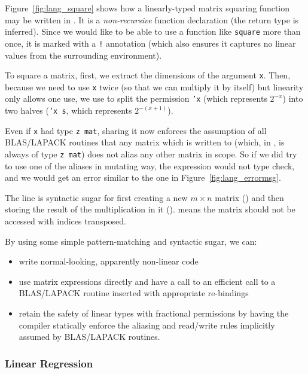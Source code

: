 Figure~\ref{fig:lang_square} shows how a linearly-typed matrix squaring
function may be written in \lang. It is a \emph{non-recursive} function
declaration (the return type is inferred). Since we would like to be able to
use a function like \texttt{square} more than once, it is marked with a
\texttt{!} annotation (which also ensures it captures no linear values from the
surrounding environment).

To square a matrix, first, we extract the dimensions of the argument
\texttt{x}. Then, because we need to use \texttt{x} twice (so that we can
multiply it by itself) but linearity only allows one use, we use  to split the permission \texttt{'x} (which
represents $2^{-x}$) into two halves (\texttt{'x s}, which represents $2^{-(x+1)}$).

Even if \texttt{x} had type \texttt{z mat}, sharing it now enforces the
assumption of all BLAS/LAPACK routines that any matrix which is written to
(which, in \lang, is always of type \texttt{z mat}) does not alias any other
matrix in scope. So if we did try to use one of the aliases in mutating way,
the expression would not type check, and we would get an error similar to the
one in Figure~\ref{fig:lang_errormsg}.

The line  is syntactic sugar for
first creating a new $m \times n$ matrix () and
then storing the result of the multiplication in it ().  means
the matrix should not be accessed with indices transposed.

By using some simple pattern-matching and syntactic sugar, we can:
\begin{itemize}
    \item write normal-looking, apparently non-linear code
    \item use matrix expressions directly and have a call to an efficient
        call to a BLAS/LAPACK routine inserted with appropriate re-bindings
    \item retain the safety of linear types with fractional permissions by
        having the compiler statically enforce the aliasing and read/write rules
        implicitly assumed by BLAS/LAPACK routines.
\end{itemize}

\subsubsection{Linear Regression}

